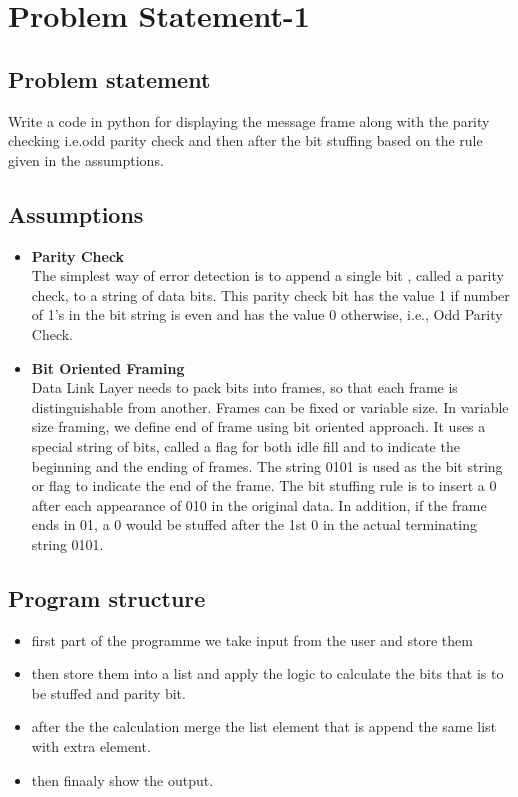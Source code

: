 \documentclass[12]{article}
\begin{document}
\newpage
\section{Problem Statement-1}

\subsection{Problem statement} 
Write a code in python for displaying the message frame along with the parity checking i.e.odd parity check and then after the bit stuffing based on the rule given in the assumptions.

\subsection{Assumptions}
\begin{itemize}
\item \textbf{Parity Check} \\
The simplest way of error detection is to append a single bit , called a parity check, to a string of data bits. This parity check bit has the value 1 if number of 1’s in the bit string is even and has the value 0 otherwise, i.e., Odd Parity Check.
\item \textbf{Bit Oriented Framing} \\
Data Link Layer needs to pack bits into frames, so that each frame is distinguishable from another. Frames can be fixed or variable size. In variable size framing, we define end of frame using bit oriented approach. It uses a special string of bits, called a flag for both idle fill and to indicate the beginning and the ending of frames.
The string 0101 is used as the bit string or flag to indicate the end of the frame. The bit stuffing rule is to insert a 0 after each appearance of 010 in the original data. In addition, if the frame ends in 01, a 0 would be stuffed after the 1st 0 in the actual terminating string 0101.

\end{itemize}
\subsection{Program structure}
\begin{itemize}
\item first part of the programme we take input from the user and store them
\item then store them into a list and apply the logic to calculate the bits that is to be stuffed and parity bit.
\item after the the calculation merge the list element that is append the same list with extra element.
\item then finaaly show the output.
\end{itemize}
\end{document}

